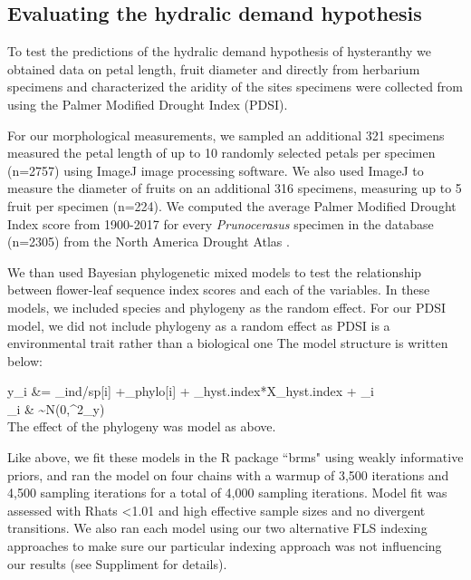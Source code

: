 \documentclass{article}[11pt]
\begin{document}
\subsection{Evaluating the hydralic demand hypothesis}

To test the predictions of the hydralic demand hypothesis of hysteranthy we obtained data on petal length, fruit diameter and directly from herbarium specimens and characterized the aridity of the sites specimens were collected from using the Palmer Modified Drought Index (PDSI).

\noindent For our morphological measurements, we sampled an additional 321 specimens measured the petal length of up to 10 randomly selected petals per specimen (n=2757) using ImageJ image processing software. We also used ImageJ to measure the diameter of fruits on an additional 316 specimens, measuring up to 5 fruit per specimen (n=224).
We computed the average Palmer Modified Drought Index score from 1900-2017 for every \textit{Prunocerasus} specimen in the database (n=2305) from the North America Drought Atlas \citep{Cook2004}.

We than used Bayesian phylogenetic mixed models to test the relationship between flower-leaf sequence index scores and each of the variables. In these models, we included species and phylogeny as the random effect. For our PDSI model, we did not include phylogeny as a random effect as PDSI is a environmental trait rather than a biological one The model structure is written below: 


  y_i &= \alpha_{ind/sp[i]} +\alpha_{phylo[i]} + \beta_{hyst.index}*X_{hyst.index} + \epsilon_i\\
  
  \epsilon_i & \sim N(0,\sigma^2_y) \\ %
  
  \noindent The effect of the phylogeny was model as above.%
  
Like above, we fit these models in the R package ``brms" \citep{} using weakly informative priors, and ran the model on four chains with a warmup of 3,500 iterations and 4,500 sampling iterations for a total of 4,000 sampling iterations. Model fit was assessed with Rhats <1.01 and high effective sample sizes and no divergent transitions. We also ran each model using our two alternative FLS indexing approaches to make sure our particular indexing approach was not influencing our results (see Suppliment for details).
\end{document}
